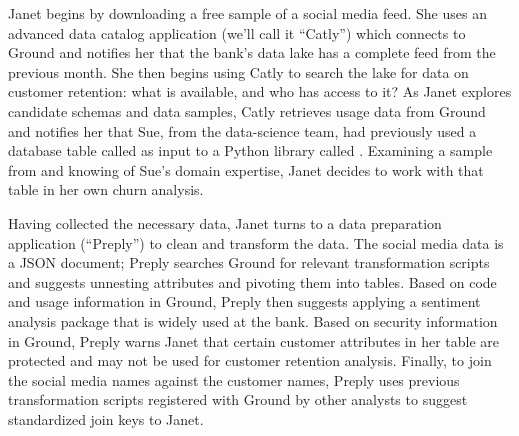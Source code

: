 \documentclass{sig-alternate}
\begin{document}
Janet 
begins by downloading a free sample of a social media feed.
She uses an advanced data catalog application (we'll call it ``Catly'') which connects to Ground 
and notifies her that the bank's data lake has a complete feed from the previous month. 
She then begins using Catly to search the lake for data on customer retention: what is available, and who has access to it?  
As Janet explores candidate schemas and data samples, Catly retrieves usage data from Ground and notifies her that Sue, from the data-science team, had previously used a database table called  as input to a Python library called .
Examining a sample from  and knowing of Sue's domain expertise, Janet decides to work with that table in her own churn analysis.  

Having collected the necessary data, Janet turns to a data preparation application (``Preply'') to clean and transform the data. 
The social media data is a JSON document; Preply searches Ground for relevant transformation scripts and suggests unnesting attributes and pivoting them into tables.
Based on code and usage information in Ground, Preply then suggests applying a sentiment analysis package that is widely used at the bank. %
Based on security information in Ground, Preply warns Janet that certain customer attributes in her table are protected and may not be used for customer retention analysis.
Finally, to join the social media names against the customer names, Preply uses previous transformation scripts registered with Ground by other analysts to suggest standardized join keys to Janet.
\end{document}
